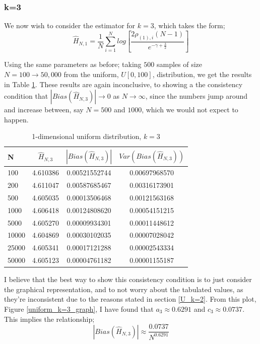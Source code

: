 \documentclass{article}
\begin{document}
\subsubsection{k=3} \label{U_k=3}
We now wish to consider the estimator for $k=3$, which takes the form;
\begin{equation} 
\hat{H}_{N, 1} = \frac{1}{N} \sum_{i=1}^{N} log \left[ \frac{2\rho_{(1),i} (N-1)}{e^{-\gamma + \frac{3}{2}}} \right] \nonumber
\end{equation}

Using the same parameters as before; taking $500$ samples of size $N=100 \to 50,000$ from the uniform, $U[0, 100]$, distribution, we get the results in Table \ref{uniform_k=3_table}. These results are again inconclusive, to showing a the consistency condition that $|Bias(\hat{H}_{N, 3})| \to 0$ as $N \to \infty$, since the numbers jump around and increase between, say $N=500$ and $1000$, which we would not expect to happen.

\begin{table}
\caption{1-dimensional uniform distribution, $k=3$} \label{uniform_k=3_table}
\begin{center}
\begin{tabular}{| l | c c c|} 
\toprule
N & $\hat{H}_{N, 3}$ & $|Bias(\hat{H}_{N, 3})|$ & $Var(Bias(\hat{H}_{N, 3}))$ \\
\midrule[1pt]
100     & 4.610386     & 0.00521552744     & 0.00697968570  \\
200     & 4.611047     & 0.00587685467     & 0.00316173901  \\
500     & 4.605035     & 0.00013506468     & 0.00121563168  \\
1000    & 4.606418     & 0.00124808620     & 0.00054151215  \\
5000    & 4.605270     & 0.00009934301     & 0.00011448612  \\
10000   & 4.604869     & 0.00030102035     & 0.00007028042  \\
25000   & 4.605341     & 0.00017121288     & 0.00002543334  \\
50000   & 4.605123     & 0.00004761182     & 0.00001155187  \\
\hline
\end{tabular}
\end{center}
\end{table}

I believe that the best way to show this consistency condition is to just consider the graphical representation, and to not worry about the tabulated values, as they're inconsistent due to the reasons stated in section \ref{U_k=2}. From this plot, Figure \ref{uniform_k=3_graph}, I have found that $a_{3} \approx 0.6291$ and $c_{3} \approx 0.0737$. This implies the relationship;
\begin{equation}
|Bias(\hat{H}_{N, 3})| \approx \frac{0.0737}{N^{0.6291}}\nonumber
\end{equation}
\end{document}
